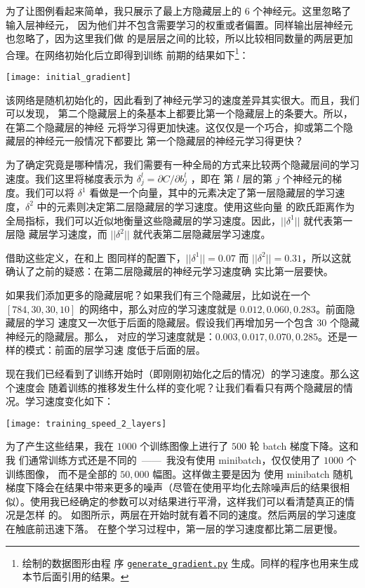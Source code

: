 为了让图例看起来简单，我只展示了最上方隐藏层上的 $6$ 个神经元。这里忽略了输入层神经元，
因为他们并不包含需要学习的权重或者偏置。同样输出层神经元也忽略了，因为这里我们做
的是层层之间的比较，所以比较相同数量的两层更加合理。在网络初始化后立即得到训练
前期的结果如下\footnote{绘制的数据图形由程
  序
  \href{https://github.com/mnielsen/neural-networks-and-deep-learning/blob/master/fig/generate_gradient.py}{\lstinline!generate_gradient.py!}
  生成。同样的程序也用来生成本节后面引用的结果。}：
\begin{center}
  \texttt{[image: initial\_gradient]}
\end{center}

该网络是随机初始化的，因此看到了神经元学习的速度差异其实很大。而且，我们可以发现，
第二个隐藏层上的条基本上都要比第一个隐藏层上的条要大。所以，在第二个隐藏层的神经
元将学习得更加快速。这仅仅是一个巧合，抑或第二个隐藏层的神经元一般情况下都要比
第一个隐藏层的神经元学习得更快？ 

为了确定究竟是哪种情况，我们需要有一种全局的方式来比较两个隐藏层间的学习速度。我们这里将梯度表示为 $\delta_j^l = \partial C/\partial b_j^l$ ，即在
第 $l$ 层的第 $j$ 个神经元的梯度。我们可以将 $\delta^1$ 看做是一个向量，其中的元素决定了第一层隐藏层的学习速度，$\delta^2$ 中的元素则决定第二层隐藏层的学习速度。使用这些向量
的欧氏距离作为全局指标，我们可以近似地衡量这些隐藏层的学习速度。因此，$||\delta^1||$ 就代表第一层隐
藏层学习速度，而 $||\delta^2||$ 就代表第二层隐藏层学习速度。 

借助这些定义，在和上
图同样的配置下，$||\delta^1|| = 0.07$ 而
$||\delta^2|| = 0.31$，所以这就确认了之前的疑惑：在第二层隐藏层的神经元学习速度确
实比第一层要快。
 
如果我们添加更多的隐藏层呢？如果我们有三个隐藏层，比如说在一个 $[784, 30, 30,
10]$ 的网络中，那么对应的学习速度就是 $0.012, 0.060, 0.283$。前面隐藏层的学习
速度又一次低于后面的隐藏层。假设我们再增加另一个包含 30 个隐藏神经元的隐藏层。那么，
对应的学习速度就是：$0.003, 0.017, 0.070, 0.285$。还是一样的模式：前面的层学习速
度低于后面的层。

现在我们已经看到了训练开始时（即刚刚初始化之后的情况）的学习速度。那么这个速度会
随着训练的推移发生什么样的变化呢？让我们看看只有两个隐藏层的情况。学习速度变化如下：
\begin{center}
  \texttt{[image: training\_speed\_2\_layers]}
\end{center}
 
为了产生这些结果，我在 $1000$ 个训练图像上进行了 $500$ 轮 batch 梯度下降。这和我
们通常训练方式还是不同的~——~我没有使用 minibatch，仅仅使用了 $1000$ 个训练图像，
而不是全部的 $50,000$ 幅图。这样做主要是因为
使用 minibatch 随机梯度下降会在结果中带来更多的噪声（尽管在使用平均化去除噪声后的结果很相
似）。使用我已经确定的参数可以对结果进行平滑，这样我们可以看清楚真正的情况是怎样
的。 如图所示，两层在开始时就有着不同的速度。然后两层的学习速度在触底前迅速下落。
在整个学习过程中，第一层的学习速度都比第二层更慢。
 
